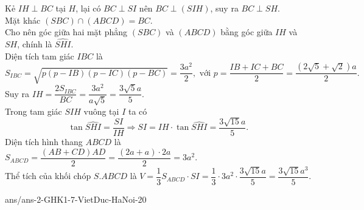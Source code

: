 \begin{ex}
{  Kẻ $IH\perp BC$ tại $H$, lại có $BC\perp SI$ nên $BC\perp (SIH)$, suy ra $BC\perp SH$.\\
  Mặt khác $(SBC)\cap (ABCD)= BC$.\\
  Cho nên góc giữa hai mặt phẳng $(SBC)$ và $(ABCD)$ bằng góc giữa $IH$ và $SH$, chính là $\widehat{SHI}$.\\
  Diện tích tam giác $IBC$ là
  \[S_{IBC}=\sqrt{p(p-IB)(p-IC)(p-BC)} = \dfrac{3a^2}{2}, \text{ với } p=\dfrac{IB+IC+BC}{2}=\dfrac{\left(2\sqrt{5}+\sqrt{2}\right)a}{2}.\]
  Suy ra $IH=\dfrac{2S_{IBC}}{BC} = \dfrac{3a^2}{a\sqrt{5}} = \dfrac{3\sqrt{5}a}{5}$.\\
  Trong tam giác $SIH$ vuông tại $I$ ta có
  \[\tan\widehat{SHI}=\dfrac{SI}{IH} \Rightarrow SI=IH\cdot \tan\widehat{SHI} = \dfrac{3\sqrt{15}a}{5}.\]
  Diện tích hình thang $ABCD$ là $S_{ABCD}=\dfrac{(AB+CD)AD}{2} = \dfrac{(2a+a)\cdot 2a}{2} = 3a^2$.\\
  Thể tích của khối chóp $S.ABCD$ là $V=\dfrac{1}{3}S_{ABCD}\cdot SI = \dfrac{1}{3}\cdot 3a^2\cdot \dfrac{3\sqrt{15}a}{5} = \dfrac{3\sqrt{15}a^3}{5}$.
  }
\end{ex}

\begin{indapan}{10}
	{ans/ans-2-GHK1-7-VietDuc-HaNoi-20}
\end{indapan}
